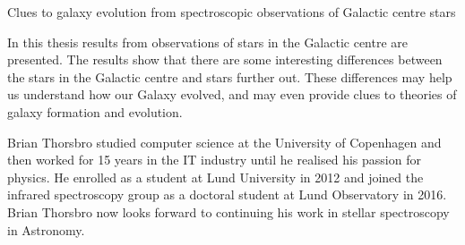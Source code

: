 Clues to galaxy evolution from spectroscopic observations of Galactic centre stars

In this thesis results from observations of stars in the Galactic centre are presented. The results show that there are some interesting differences between the stars in the Galactic centre and stars further out. These differences may help us understand how our Galaxy evolved, and may even provide clues to theories of galaxy formation and evolution.

Brian Thorsbro studied computer science at the University of Copenhagen and then worked for 15 years in the IT industry until he realised his passion for physics. He enrolled as a student at Lund University in 2012 and joined the infrared spectroscopy group as a doctoral student at Lund Observatory in 2016. Brian Thorsbro now looks forward to continuing his work in stellar spectroscopy in Astronomy.
